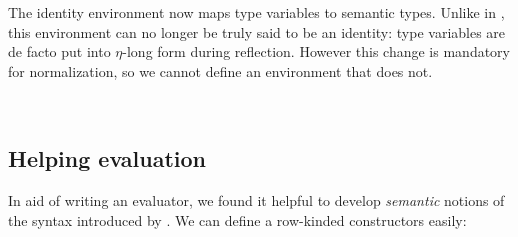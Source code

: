 \documentclass[authoryear, acmsmall, screen, review, nonacm]{acmart}
\begin{document}
The identity environment now maps type variables to semantic types. Unlike in \citet{ChapmanKNW19}, this environment can no longer be truly said to be an identity: type variables are de facto put into $\eta$-long form during reflection. However this change is mandatory for normalization, so we cannot define an environment that does not.

\begin{code}%
\>[0]\AgdaSpace{}%
\AgdaSymbol{:}\AgdaSpace{}%
\AgdaSpace{}%
\AgdaSpace{}%
\<%
\\
\>[0]\AgdaSpace{}%
\AgdaSymbol{=}\AgdaSpace{}%
\AgdaSpace{}%
\AgdaSpace{}%
\<%
\end{code}

\subsection{Helping evaluation}

In aid of writing an evaluator, we found it helpful to develop \emph{semantic} notions of the syntax introduced by \Rome. We can define a row-kinded constructors easily:
\end{document}
